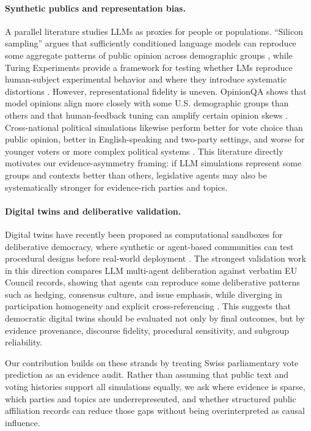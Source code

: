 \documentclass[letterpaper]{article}
\begin{document}
\paragraph{Synthetic publics and representation bias.}
A parallel literature studies LLMs as proxies for people or populations. ``Silicon sampling'' argues that sufficiently conditioned language models can reproduce some aggregate patterns of public opinion across demographic groups \citep{argyle2023outofone}, while Turing Experiments provide a framework for testing whether LMs reproduce human-subject experimental behavior and where they introduce systematic distortions \citep{aher2023simulateMultipleHumans}. However, representational fidelity is uneven. OpinionQA shows that model opinions align more closely with some U.S. demographic groups than others and that human-feedback tuning can amplify certain opinion skews \citep{santurkar2023whoseOpinions}. Cross-national political simulations likewise perform better for vote choice than public opinion, better in English-speaking and two-party settings, and worse for younger voters or more complex political systems \citep{qi2025representationBias}. This literature directly motivates our evidence-asymmetry framing: if LLM simulations represent some groups and contexts better than others, legislative agents may also be systematically stronger for evidence-rich parties and topics.

\paragraph{Digital twins and deliberative validation.}
Digital twins have recently been proposed as computational sandboxes for deliberative democracy, where synthetic or agent-based communities can test procedural designs before real-world deployment \citep{novelli2025replicaDemocracies}. The strongest validation work in this direction compares LLM multi-agent deliberation against verbatim EU Council records, showing that agents can reproduce some deliberative patterns such as hedging, consensus culture, and issue emphasis, while diverging in participation homogeneity and explicit cross-referencing \citep{sheldon2026deliberationSilico}. This suggests that democratic digital twins should be evaluated not only by final outcomes, but by evidence provenance, discourse fidelity, procedural sensitivity, and subgroup reliability.

Our contribution builds on these strands by treating Swiss parliamentary vote prediction as an evidence audit. Rather than assuming that public text and voting histories support all simulations equally, we ask where evidence is sparse, which parties and topics are underrepresented, and whether structured public affiliation records can reduce those gaps without being overinterpreted as causal influence.
\end{document}
